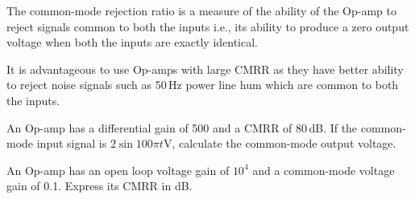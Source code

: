 The common-mode rejection ratio is a measure of the ability of the Op-amp to reject signals common to both the inputs i.e., its ability to produce a zero output voltage when both the inputs are exactly identical.

It is advantageous to use Op-amps with large CMRR as they have better ability to reject noise signals such as 50\,Hz power line hum which are common to both the inputs.

\smallskip

\begin{example}\label{exam5.4}
An Op-amp has a differential gain of 500 and a CMRR of 80\,dB. If the common-mode input signal is $2\sin 100\pi t$V, calculate the common-mode output voltage.
\end{example}


\begin{example}\label{exam5.5}
An Op-amp has an open loop voltage gain of $10^{4}$ and a common-mode voltage gain of 0.1. Express its CMRR in dB.
\end{example}


